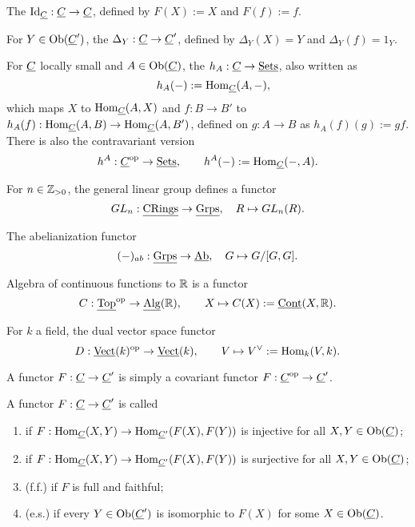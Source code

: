 \begin{examples*}
	\item The  \( \mathrm{Id}_{\underline{C}}: \underline{C} \to \underline{C} \), defined by \( F(X) := X \) and \( F(f) := f \).
	\item For \( Y \in \operatorname{Ob}(\underline{C}') \), the  \( \Delta_Y: \underline{C} \to \underline{C}' \), defined by \( \Delta_Y(X) = Y \) and \( \Delta_Y(f) = 1_Y \).

	\item For \( \underline{C} \) locally small and \( A \in \operatorname{Ob}(\underline{C}) \), the  \( h_A: \underline{C} \to \underline{\mathrm{Sets}} \), also written as
		\[
			\quad h_A(-) := \operatorname{Hom}_{\underline{C}}(A, -),
		\]
		which maps \( X \) to \( \operatorname{Hom}_{\underline{C}}(A, X) \) and \( f: B \to B' \) to \( h_A(f): \operatorname{Hom}_{\underline{C}}(A, B) \to \operatorname{Hom}_{\underline{C}}(A, B') \), defined on \( g: A \to B \) as \( h_A(f)(g) := g f \). There is also the contravariant version
		\[
			h^A: \underline{C}^\mathrm{op} \to \underline{\mathrm{Sets}}, \qquad h^A(-) := \operatorname{Hom}_{\underline{C}}(-, A).
		\]

	\item For \( n \in \mathbb{Z}_{> 0} \), the general linear group defines a functor
		\[
			GL_n: \underline{\mathrm{CRings}} \to \underline{\mathrm{Grps}}, \quad R \mapsto GL_n(R).
		\]

	\item The abelianization functor
		\[
			(-)_{ab}: \underline{\mathrm{Grps}} \to \underline{\mathrm{Ab}}, \quad G \mapsto G/[G, G].
		\]

	\item Algebra of continuous functions to \( \mathbb{R} \) is a functor
		\[
			C: \underline{\mathrm{Top}}^\mathrm{op} \to \underline{\mathrm{Alg}}(\mathbb{R}), \qquad X \mapsto C(X) := \underline{\mathrm{Cont}}(X, \mathbb{R}).
		\]

	\item For \( k \) a field, the dual vector space functor
		\[
			D: \underline{\mathrm{Vect}}(k)^\mathrm{op} \to \underline{\mathrm{Vect}}(k), \qquad V \mapsto V^{\vee} := \operatorname{Hom}_k(V, k).
		\]
\end{examples*}

\begin{definition*}
	A  functor \( F: \underline{C} \to \underline{C}' \) is simply a covariant functor \( F: \underline{C}^\mathrm{op} \to \underline{C}' \).
\end{definition*}

\begin{definition*}
	A functor \( F: \underline{C} \to \underline{C}' \) is called
	\begin{enumerate}
		\item {} if \( F: \operatorname{Hom}_{\underline{C}}(X, Y) \to \operatorname{Hom}_{\underline{C}'}(F(X), F(Y)) \) is injective for all \( X, Y \in \operatorname{Ob}(\underline{C}) \);
		\item {} if \( F: \operatorname{Hom}_{\underline{C}}(X, Y) \to \operatorname{Hom}_{\underline{C}'}(F(X), F(Y)) \) is surjective for all \( X, Y \in \operatorname{Ob}(\underline{C}) \);
		\item {} (f.f.) if \( F \) is full and faithful;
		\item {} (e.s.) if every \( Y \in \operatorname{Ob}(\underline{C}') \) is isomorphic to \( F(X) \) for some \( X \in \operatorname{Ob}(\underline{C}) \).
	\end{enumerate}
\end{definition*}

